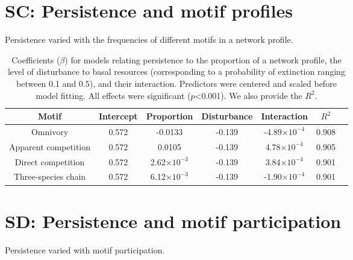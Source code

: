 \documentclass[12pt]{article}
\begin{document}
\begin{spacing}{2.0}
\section{SC: Persistence and motif profiles}

    Persistence varied with the frequencies of different motifs in a network profile.

    
    \begin{table}[h!]
        \caption{Coefficients ($\beta$) for models relating persistence to the proportion of a network profile, the level of disturbance to basal resources (corresponding to a probability of extinction ranging between 0.1 and 0.5), and their interaction. Predictors were centered and scaled before model fitting. All effects were significant ($p$\textless0.001). We also provide the $R^2$. }
        \label{motif_profile_tab}
        \centering
        \begin{tabular}{c|c c c c c | c}
            Motif & Intercept & Proportion & Disturbance & Interaction & $R^2$\\
            \hline
            Omnivory & 0.572 & -0.0133 & -0.139 & -4.89$\times10^{-4}$ & 0.908 \\
            Apparent competition & 0.572 & 0.0105 & -0.139 & 4.78$\times10^{-4}$ & 0.905 \\
            Direct competition & 0.572 & 2.62$\times10^{-3}$ & -0.139 & 3.84$\times10^{-4}$ & 0.901 \\
            Three-species chain & 0.572 & 6.12$\times10^{-3}$ & -0.139 & -1.90$\times10^{-4}$ & 0.901 \\ 
        \end{tabular}
    \end{table}


\clearpage


\section{SD: Persistence and motif participation}

    Persistence varied with motif participation.


\end{spacing}
\end{document}
